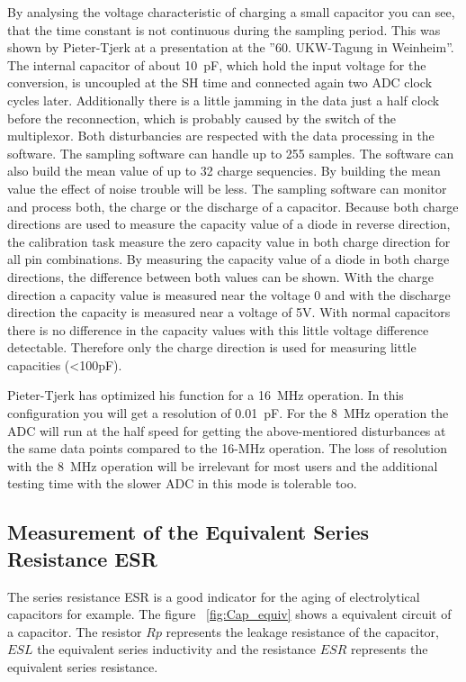 By analysing the voltage characteristic of charging a small capacitor you can see, that the time constant
is not continuous during the sampling period. This was shown by Pieter-Tjerk at a presentation at
the ''60. UKW-Tagung in Weinheim''. The internal capacitor of about 10~pF, which hold the input voltage
for the conversion, is uncoupled at the SH time and connected again two ADC clock cycles later. 
Additionally there is a little jamming in the data just a half clock before the reconnection,
which is probably caused by the switch of the multiplexor.
Both disturbancies are respected with the data processing in the software.
The sampling software can handle up to 255 samples. The software can also build the mean value of
up to 32 charge sequencies. By building the mean value the effect of noise trouble will be less.
The sampling software can monitor and process both, the charge or the discharge of a capacitor.
Because both charge directions are used to measure the capacity value of a diode in reverse direction,
the calibration task measure the zero capacity value in both charge direction for all pin combinations.
By measuring the capacity value of a diode in both charge directions, the difference between both
values can be shown.
With the charge direction a capacity value is measured near the voltage 0 and with
the discharge direction the capacity is measured near a voltage of 5V.
With normal capacitors there is no difference in the capacity values with this little voltage difference detectable.
Therefore only the charge direction is used for measuring little capacities (\textless 100pF).

Pieter-Tjerk has optimized his function for a 16~MHz operation.
In this configuration you will get a resolution of 0.01~pF.
For the 8~MHz operation the ADC will run at the half speed for getting the above-mentiored disturbances
at the same data points compared to the 16-MHz operation.
The loss of resolution with the 8~MHz operation will be irrelevant for most users and the
additional testing time with the slower ADC in this mode is tolerable too.



\subsection{Measurement of the Equivalent Series Resistance ESR}
The series resistance ESR \cite{ESR} is a good indicator for the aging of electrolytical capacitors for example.
The figure ~\ref{fig:Cap_equiv} shows a equivalent circuit of a capacitor.
The resistor \(Rp\) represents the leakage resistance of the capacitor, \(ESL\) the equivalent series inductivity and
the resistance \(ESR\) represents the equivalent series resistance.

